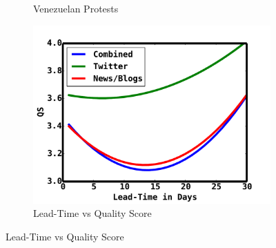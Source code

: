 \documentclass[letterpaper]{article}
\begin{document}
\begin{figure}
\begin{subfigure}{.70\columnwidth}
  \vspace{-0.5em}
  \caption{\scriptsize Venezuelan Protests}
  \label{fig:venezuela_feb}
\end{subfigure}\hspace{.5pt}
\begin{subfigure}{.70\columnwidth}
    \centering
  \includegraphics[scale=0.2]{leadTimeVsQS}
  \vspace{-0.5em}
  \caption{\scriptsize Lead-Time vs Quality Score}
  \label{fig:leadTimeVsQS}
\end{subfigure}


\end{figure}
\end{document}
